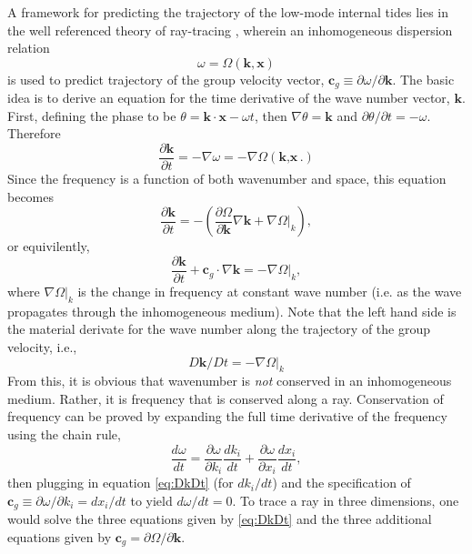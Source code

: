 \documentclass[12pt]{article}
\newcommand{\kv}{$\textbf{k}$}
\begin{document}
A framework for predicting the trajectory of the low-mode internal tides lies in the well referenced theory of ray-tracing \cite{Lighthill76}, wherein an inhomogeneous dispersion relation 
\begin{equation}
	\label{eq:dispersion}
	\omega = \Omega({\textbf{k},\textbf{x}})
\end{equation}
is used to predict trajectory of the group velocity vector, $\textbf{c}_g\equiv\partial\omega/\partial\textbf{k}$. The basic idea is to derive an equation for the time derivative of the wave number vector, \kv. First, defining the phase to be $\theta = \textbf{k}\cdot\textbf{x}-\omega t$, then $\nabla\theta = \textbf{k}$ and $\partial\theta/\partial t = -\omega$. Therefore
	\begin{equation}
	\frac{\partial\textbf{k}}{\partial t} = -\nabla\omega = -\nabla\Omega({\textbf{k},\textbf{x}}.)
\end{equation}
Since the frequency is a function of both wavenumber and space, this equation becomes
\begin{equation}
	\frac{\partial\textbf{k}}{\partial t} = -\left(\frac{\partial\Omega}{\partial\textbf{k}}\nabla\textbf{k} + \nabla\Omega|_k  \right),
\end{equation}
or equivilently,
\begin{equation}
	\frac{\partial\textbf{k}}{\partial t} + \textbf{c}_g\cdot\nabla\textbf{k} = -\nabla\Omega|_k,	
\end{equation}
where $\nabla\Omega|_k$ is the change in frequency at constant wave number (i.e. as the wave propagates through the inhomogeneous medium). Note that the left hand side is the material derivate for the wave number along the trajectory of the group velocity, i.e., 
\begin{equation}
	\label{eq:DkDt}
	D\textbf{k}/Dt = -\nabla\Omega|_k
\end{equation}
From this, it is obvious that wavenumber is \textit{not} conserved in an inhomogeneous medium. Rather, it is frequency that is conserved along a ray. Conservation of frequency can be proved by expanding the full time derivative of the frequency using the chain rule, 
\begin{equation}
	\label{eq:DomegaDt}
	\frac{d\omega}{dt} = \frac{\partial\omega}{\partial k_i}\frac{dk_i}{dt} + \frac{\partial\omega}{\partial x_i}\frac{dx_i}{dt},
\end{equation}
then plugging in equation \ref{eq:DkDt} (for $dk_i/dt$) and the specification of $\textbf{c}_g \equiv \partial\omega/\partial k_i = dx_i/dt$ to yield $d\omega/dt = 0$. To trace a ray in three dimensions, one would solve the three equations given by \ref{eq:DkDt} and the three additional equations given by $\textbf{c}_g = \partial\Omega/\partial\textbf{k}$.
\end{document}
